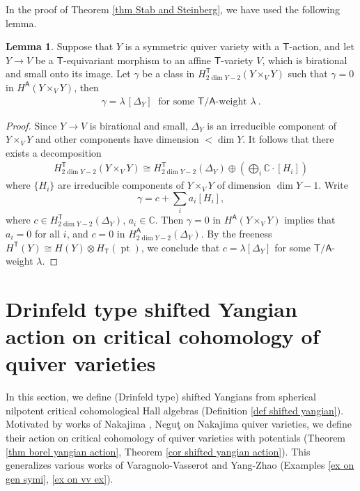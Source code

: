 \documentclass[10pt]{amsart}
\theoremstyle{definition}
\newtheorem{Lemma}[Theorem]{Lemma}
\newtheorem{Corollary}[Theorem]{Corollary}
\numberwithin{equation}{section}
\newcommand{\bC}{\mathbb{C}}
\newcommand{\sA}{\mathsf{A}}
\newcommand{\sT}{\mathsf{T}}
\newcommand{\Fix}{\operatorname{Fix}}
\newcommand{\pt}{\operatorname{pt}}
\begin{document}
In the proof of Theorem \ref{thm Stab and Steinberg}, we have used the following lemma.

\begin{Lemma}\label{lem on A vs T loc}
Suppose that $Y$ is a symmetric quiver variety with a $\sT$-action, and let $Y\to V$ be a $\sT$-equivariant morphism to an affine $\sT$-variety $V$, which is birational and small onto its image. Let $\gamma$ be a class in $H^\sT_{2\dim Y-2}(Y\times_{V}Y)$ such that $\gamma=0$ in $H^\sA(Y\times_{V}Y)$, then
\begin{align*}
    \gamma=\lambda\,[\Delta_Y]\;\text{ for some $\sT/\sA$-weight $\lambda$}\:.
\end{align*}
\end{Lemma}

\begin{proof}
Since $Y\to V$ is birational and small, $\Delta_Y$ is an irreducible component of $Y\times_{V}Y$ and other components have dimension $<\dim Y$. It follows that there exists a decomposition
\begin{align*}
    H^{\sT}_{2\dim Y-2}(Y\times_{V}Y)\cong  H^{\sT}_{2\dim Y-2}(\Delta_Y)\oplus \left(\bigoplus_i \bC\cdot [H_i]\right)
\end{align*}
where $\{H_i\}$ are irreducible components of $Y\times_{V} Y$ of dimension $\dim Y-1$. Write $$\gamma=c+\sum_{i}a_i[H_i], $$ 
where $c\in H^{\sT}_{2\dim Y-2}(\Delta_Y)$, $a_i\in \bC$. Then $\gamma=0$ in $H^\sA(Y\times_{V}Y)$ implies that $a_i=0$ for all $i$, and $c=0$ in $H^{\sA}_{2\dim Y-2}(\Delta_Y)$. By the freeness $H^\sT(Y)\cong H(Y)\otimes H_\sT(\pt)$, we conclude that $c=\lambda[\Delta_Y]$ for some $\sT/\sA$-weight $\lambda$.
\end{proof}


\section{Drinfeld type shifted Yangian action on critical cohomology of quiver varieties}\label{sec double of COHA}

In this section, we define 
(Drinfeld type) shifted Yangians from spherical nilpotent critical cohomological Hall algebras (Definition \ref{def shifted yangian}). 
Motivated by works of Nakajima \cite{Nak1}, Negu\c{t} \cite{N2} on Nakajima quiver varieties, we define their action on critical cohomology of quiver varieties with potentials (Theorem \ref{thm borel yangian action}, Theorem \ref{cor shifted yangian action}). This generalizes various works of Varagnolo-Vasserot \cite{VV1, VV2} and Yang-Zhao \cite{YZ3} (Examples \ref{ex on gen symi}, \ref{ex on vv ex}).
\end{document}
